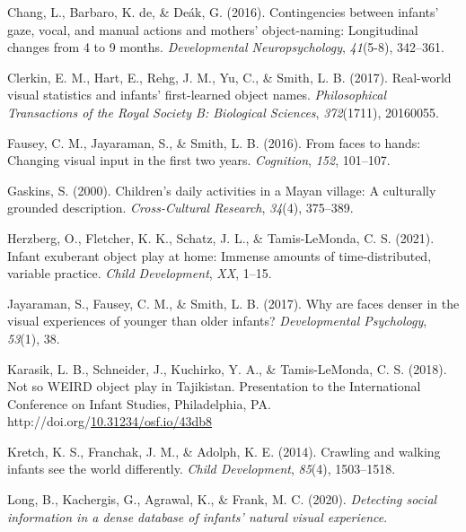 \documentclass[10pt, letterpaper]{article}
\newenvironment{CSLReferences}%
  {}%
  {\par}
\begin{document}
\begin{CSLReferences}{1}{0}
\leavevmode\hypertarget{ref-chang2016contingencies}{}%
Chang, L., Barbaro, K. de, \& Deák, G. (2016). Contingencies between
infants' gaze, vocal, and manual actions and mothers' object-naming:
Longitudinal changes from 4 to 9 months. \emph{Developmental
Neuropsychology}, \emph{41}(5-8), 342--361.

\leavevmode\hypertarget{ref-clerkin2017real}{}%
Clerkin, E. M., Hart, E., Rehg, J. M., Yu, C., \& Smith, L. B. (2017).
Real-world visual statistics and infants' first-learned object names.
\emph{Philosophical Transactions of the Royal Society B: Biological
Sciences}, \emph{372}(1711), 20160055.

\leavevmode\hypertarget{ref-fausey2016faces}{}%
Fausey, C. M., Jayaraman, S., \& Smith, L. B. (2016). From faces to
hands: Changing visual input in the first two years. \emph{Cognition},
\emph{152}, 101--107.

\leavevmode\hypertarget{ref-gaskins2000childrens}{}%
Gaskins, S. (2000). Children's daily activities in a {M}ayan village: A
culturally grounded description. \emph{Cross-Cultural Research},
\emph{34}(4), 375--389.

\leavevmode\hypertarget{ref-herzberg2021exuberant}{}%
Herzberg, O., Fletcher, K. K., Schatz, J. L., \& Tamis-LeMonda, C. S.
(2021). Infant exuberant object play at home: Immense amounts of
time-distributed, variable practice. \emph{Child Development},
\emph{XX}, 1--15.

\leavevmode\hypertarget{ref-jayaraman2017faces}{}%
Jayaraman, S., Fausey, C. M., \& Smith, L. B. (2017). Why are faces
denser in the visual experiences of younger than older infants?
\emph{Developmental Psychology}, \emph{53}(1), 38.

\leavevmode\hypertarget{ref-karasik2018not}{}%
Karasik, L. B., Schneider, J., Kuchirko, Y. A., \& Tamis-LeMonda, C. S.
(2018). Not so {WEIRD} object play in {T}ajikistan. Presentation to the
International Conference on Infant Studies, Philadelphia, PA.
http://doi.org/\href{https://doi.org/10.31234/osf.io/43db8}{10.31234/osf.io/43db8}

\leavevmode\hypertarget{ref-kretch2014crawling}{}%
Kretch, K. S., Franchak, J. M., \& Adolph, K. E. (2014). Crawling and
walking infants see the world differently. \emph{Child Development},
\emph{85}(4), 1503--1518.

\leavevmode\hypertarget{ref-long2020detecting}{}%
Long, B., Kachergis, G., Agrawal, K., \& Frank, M. C. (2020).
\emph{Detecting social information in a dense database of infants'
natural visual experience}.


\end{CSLReferences}
\end{document}

